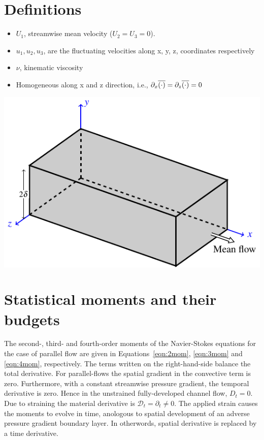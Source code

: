 \documentclass[letter,10pt,notitlepage]{article}
\newcommand*{\oline}[1]{\overline{#1\mathstrut}}
\begin{document}
\section*{Definitions}
\begin{minipage}[t!]{80mm}
\begin{itemize}
\item $U_1$, streamwise mean velocity ($U_2=U_3=0$).
\item $u_1,u_2,u_3$, are the fluctuating velocities along x, y, z, coordinates respectively
\item $\nu$, kinematic viscosity
\item Homogeneous along x and z direction, i.e., $\partial_x \oline{(\cdot)}=\partial_z \oline{(\cdot)}=0$
\end{itemize}
\end{minipage}
\hfill
\begin{minipage}[t!]{90mm}
\includegraphics[angle=0.0,width=\textwidth]{channelFig.pdf}
\end{minipage}

\section*{Statistical moments and their budgets}
The second-, third- and fourth-order moments of the Navier-Stokes equations for the case of parallel flow
are given in Equations~\eqref{eqn:2mom}, \eqref{eqn:3mom} and \eqref{eqn:4mom}, respectively.  The terms written on the right-hand-side 
balance the total derivative.  For parallel-flows the spatial gradient in the convective term is zero.  
Furthermore, with a constant streamwise pressure gradient, the temporal derivative is zero.  
Hence in the unstrained fully-developed channel flow, $D_t=0$.  Due to straining the material derivative is $\mathcal{D}_t=\partial_t \neq 0$.  The applied strain causes the moments to evolve in time, anologous to spatial development of an adverse pressure gradient boundary layer.  In otherwords, spatial derivative is replaced by a time derivative.
\end{document}
